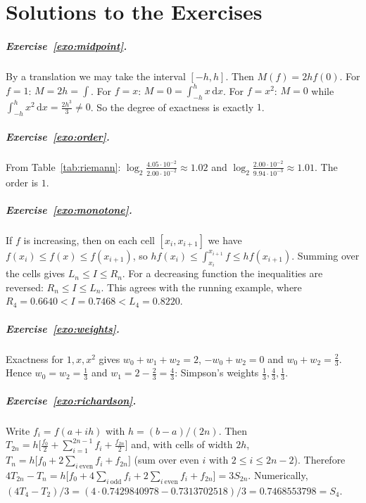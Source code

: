 \documentclass[11pt,a4paper,twoside,openright]{book}
\newcommand{\dd}{\,\mathrm{d}}
\newcounter{exo}[chapter]
\begin{document}
\chapter{Solutions to the Exercises}\label{app:solutions}

\paragraph{Exercise~\ref{exo:midpoint}.}
By a translation we may take the interval $[-h,h]$. Then $M(f)=2hf(0)$. For $f=1$: $M=2h=\int$. For $f=x$: $M=0=\int_{-h}^{h}x\dd x$. For $f=x^{2}$: $M=0$ while $\int_{-h}^{h}x^{2}\dd x=\frac{2h^{3}}{3}\ne0$. So the degree of exactness is exactly $1$.

\paragraph{Exercise~\ref{exo:order}.}
From Table~\ref{tab:riemann}: $\log_2\frac{4.05\cdot10^{-2}}{2.00\cdot10^{-2}}\approx1.02$ and $\log_2\frac{2.00\cdot10^{-2}}{9.94\cdot10^{-3}}\approx1.01$. The order is $1$.

\paragraph{Exercise~\ref{exo:monotone}.}
If $f$ is increasing, then on each cell $[x_i,x_{i+1}]$ we have $f(x_i)\le f(x)\le f(x_{i+1})$, so $hf(x_i)\le\int_{x_i}^{x_{i+1}}f\le hf(x_{i+1})$. Summing over the cells gives $L_n\le I\le R_n$. For a decreasing function the inequalities are reversed: $R_n\le I\le L_n$. This agrees with the running example, where $R_4=0.6640<I=0.7468<L_4=0.8220$.

\paragraph{Exercise~\ref{exo:weights}.}
Exactness for $1,x,x^{2}$ gives $w_0+w_1+w_2=2$, $-w_0+w_2=0$ and $w_0+w_2=\frac23$. Hence $w_0=w_2=\frac13$ and $w_1=2-\frac23=\frac43$: Simpson's weights $\frac13,\frac43,\frac13$.

\paragraph{Exercise~\ref{exo:richardson}.}
Write $f_i=f(a+ih)$ with $h=(b-a)/(2n)$. Then $T_{2n}=h\bigl[\frac{f_0}{2}+\sum_{i=1}^{2n-1}f_i+\frac{f_{2n}}2\bigr]$ and, with cells of width $2h$, $T_n=h\bigl[f_0+2\sum_{i\ \text{even}}f_i+f_{2n}\bigr]$ (sum over even $i$ with $2\le i\le 2n-2$). Therefore
$4T_{2n}-T_n=h\bigl[f_0+4\sum_{i\ \text{odd}}f_i+2\sum_{i\ \text{even}}f_i+f_{2n}\bigr]=3S_{2n}$.
Numerically, $(4T_4-T_2)/3=(4\cdot0.7429840978-0.7313702518)/3=0.7468553798=S_4$.
\end{document}
